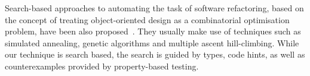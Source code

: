 \documentclass[10pt,conference]{IEEEtran}
\begin{document}
Search-based approaches to automating the task of software refactoring, based
on the concept of treating object-oriented design as a combinatorial optimisation
problem, have been also proposed~\cite{search1,search2}. They usually make use of techniques such as
simulated annealing, genetic algorithms and multiple ascent hill-climbing.
While our technique is search based, the search is guided by types, code hints, as well as counterexamples
provided by property-based testing.
\end{document}
